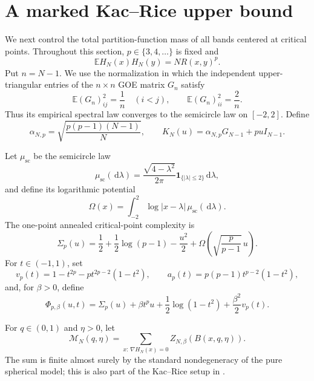 \documentclass[11pt,reqno]{amsart}
\numberwithin{equation}{section}
\theoremstyle{plain}
\theoremstyle{definition}
\theoremstyle{remark}
\newcommand{\E}{\mathbb E}
\newcommand{\1}{\mathbf 1}
\newcommand{\dd}{\,\mathrm d}
\newcommand{\MN}{\mathcal M_N}
\newcommand{\SigmaP}{\Sigma_p}
\newcommand{\PhiP}{\Phi_{p,\beta}}
\newcommand{\Om}{\Omega}
\begin{document}
\section{A marked Kac--Rice upper bound}\label{sec:KR}

We next control the total partition-function mass of all bands centered
at critical points.  Throughout this section, \(p\in\{3,4,\ldots\}\)
is fixed and
\[
 \E H_N(x)H_N(y)=N R(x,y)^p.
\]
Put \(n=N-1\).  We use the normalization in which the independent
upper-triangular entries of the \(n\times n\) GOE matrix \(G_n\) satisfy
\begin{equation}\label{eq:GOEnormalization}
 \E(G_n)_{ij}^2=\frac1n\quad(i<j),
 \qquad
 \E(G_n)_{ii}^2=\frac2n.
\end{equation}
Thus its empirical spectral law converges to the semicircle law on
\([-2,2]\).  Define
\begin{equation}\label{eq:KNexact}
 \alpha_{N,p}=\sqrt{\frac{p(p-1)(N-1)}N},
 \qquad
 K_N(u)=\alpha_{N,p}G_{N-1}+puI_{N-1}.
\end{equation}

Let \(\mu_{\mathrm{sc}}\) be the semicircle law
\[
 \mu_{\mathrm{sc}}(\dd\lambda)
 =\frac{\sqrt{4-\lambda^2}}{2\pi}
  \1_{\{|\lambda|\leq2\}}\dd\lambda,
\]
and define its logarithmic potential
\begin{equation}\label{eq:Omega}
 \Om(x)=\int_{-2}^2\log\lvert x-\lambda\rvert\,
 \mu_{\mathrm{sc}}(\dd\lambda).
\end{equation}
The one-point annealed critical-point complexity is
\begin{equation}\label{eq:Sigma}
 \SigmaP(u)
 =\frac12+\frac12\log(p-1)-\frac{u^2}{2}
  +\Om\left(\sqrt{\frac{p}{p-1}}\,u\right).
\end{equation}
For \(t\in(-1,1)\), set
\begin{equation}\label{eq:vpt}
 v_p(t)=1-t^{2p}-p t^{2p-2}(1-t^2),
 \qquad
 a_p(t)=p(p-1)t^{p-2}(1-t^2),
\end{equation}
and, for \(\beta>0\), define
\begin{equation}\label{eq:PhiGeneral}
 \PhiP(u,t)
 =\SigmaP(u)+\beta t^p u
  +\frac12\log(1-t^2)
  +\frac{\beta^2}{2}v_p(t).
\end{equation}

For \(q\in(0,1)\) and \(\eta>0\), let
\begin{equation}\label{eq:markedmass}
 \MN(q,\eta)
 =\sum_{x:\,\nabla H_N(x)=0} Z_{N,\beta}(B(x,q,\eta)).
\end{equation}
The sum is finite almost surely by the standard nondegeneracy of the
pure spherical model; this is also part of the Kac--Rice setup in
\cite[Section~3]{AuffingerBenArousCerny2013}.
\end{document}
